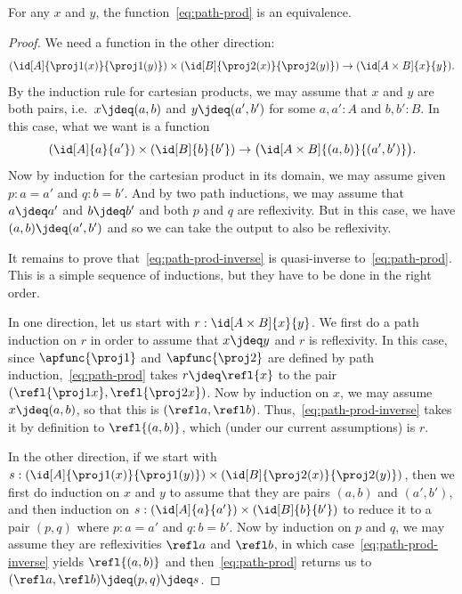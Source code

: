 %
\begin{thm}\label{thm:path-prod}
  For any $x$ and $y$, the function~\eqref{eq:path-prod} is an equivalence.
\end{thm}

\begin{proof}
  We need a function in the other direction:
  \begin{equation}
    (\id[A]{\proj1(x)}{\proj1(y)}) \times (\id[B]{\proj2(x)}{\proj2(y)}) \to (\id[A\times B]{x}{y}). \label{eq:path-prod-inverse}
  \end{equation}
  By the induction rule for cartesian products, we may assume that $x$ and $y$ are both pairs, i.e.\ $x\jdeq (a,b)$ and $y\jdeq (a',b')$ for some $a,a':A$ and $b,b':B$.
  In this case, what we want is a function
  \begin{equation*}
    (\id[A]{a}{a'}) \times (\id[B]{b}{b'}) \to \big(\id[A\times B]{(a,b)}{(a',b')}\big).
  \end{equation*}
  Now by induction for the cartesian product in its domain, we may assume given $p:a=a'$ and $q:b=b'$.
  And by two path inductions, we may assume that $a\jdeq a'$ and $b\jdeq b'$ and both $p$ and $q$ are reflexivity.
  But in this case, we have $(a,b)\jdeq(a',b')$ and so we can take the output to also be reflexivity.

  It remains to prove that~\eqref{eq:path-prod-inverse} is quasi-inverse to~\eqref{eq:path-prod}.
  This is a simple sequence of inductions, but they have to be done in the right order.

  In one direction, let us start with $r:\id[A\times B]{x}{y}$.
  We first do a path induction on $r$ in order to assume that $x\jdeq y$ and $r$ is reflexivity.
  In this case, since $\apfunc{\proj1}$ and $\apfunc{\proj2}$ are defined by path induction,~\eqref{eq:path-prod} takes $r\jdeq \refl{x}$ to the pair $(\refl{\proj1x},\refl{\proj2x})$.
  Now by induction on $x$, we may assume $x\jdeq (a,b)$, so that this is $(\refl a, \refl b)$.
  Thus,~\eqref{eq:path-prod-inverse} takes it by definition to $\refl{(a,b)}$, which (under our current assumptions) is $r$.

  In the other direction, if we start with $s:(\id[A]{\proj1(x)}{\proj1(y)}) \times (\id[B]{\proj2(x)}{\proj2(y)})$, then we first do induction on $x$ and $y$ to assume that they are pairs $(a,b)$ and $(a',b')$, and then induction on $s:(\id[A]{a}{a'}) \times (\id[B]{b}{b'})$ to reduce it to a pair $(p,q)$ where $p:a=a'$ and $q:b=b'$.
  Now by induction on $p$ and $q$, we may assume they are reflexivities $\refl a$ and $\refl b$, in which case~\eqref{eq:path-prod-inverse} yields $\refl{(a,b)}$ and then~\eqref{eq:path-prod} returns us to $(\refl a,\refl b)\jdeq (p,q)\jdeq s$.
\end{proof}
